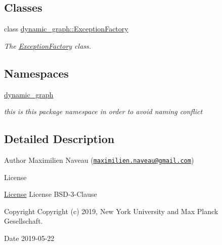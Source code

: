 \subsection*{Classes}
\begin{DoxyCompactItemize}
\item 
class \hyperlink{classdynamic__graph_1_1ExceptionFactory}{dynamic\+\_\+graph\+::\+Exception\+Factory}
\begin{DoxyCompactList}\small\item\em The \hyperlink{classdynamic__graph_1_1ExceptionFactory}{Exception\+Factory} class. \end{DoxyCompactList}\end{DoxyCompactItemize}
\subsection*{Namespaces}
\begin{DoxyCompactItemize}
\item 
 \hyperlink{namespacedynamic__graph}{dynamic\+\_\+graph}
\begin{DoxyCompactList}\small\item\em this is this package namespace in order to avoid naming conflict \end{DoxyCompactList}\end{DoxyCompactItemize}


\subsection{Detailed Description}
\begin{DoxyAuthor}{Author}
Maximilien Naveau (\href{mailto:maximilien.naveau@gmail.com}{\tt maximilien.\+naveau@gmail.\+com}) 
\end{DoxyAuthor}
\begin{DoxyRefDesc}{License}
\item[\hyperlink{license__license000008}{License}]License B\+S\+D-\/3-\/\+Clause \end{DoxyRefDesc}
\begin{DoxyCopyright}{Copyright}
Copyright (c) 2019, New York University and Max Planck Gesellschaft. 
\end{DoxyCopyright}
\begin{DoxyDate}{Date}
2019-\/05-\/22 
\end{DoxyDate}
